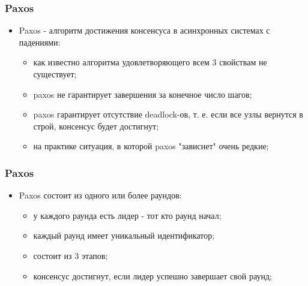 \begin{frame}
\frametitle{Paxos}
\begin{itemize}
  \item Paxos - алгоритм достижения консенсуса в асинхронных системах с падениями:
    \begin{itemize}
      \item как известно алгоритма удовлетворяющего всем 3 свойствам не существует;
      \item paxos не гарантирует завершения за конечное число шагов;
      \item paxos гарантирует отсутствие deadlock-ов, т. е. если все узлы вернутся в строй, консенсус будет достигнут;
      \item на практике ситуация, в которой paxos "зависнет" очень редкие;
    \end{itemize}
\end{itemize}
\end{frame}

\begin{frame}
\frametitle{Paxos}
\begin{itemize}
  \item Paxos состоит из одного или более раундов:
    \begin{itemize}
      \item у каждого раунда есть лидер - тот кто раунд начал;
      \item каждый раунд имеет уникальный идентификатор;
      \item состоит из 3 этапов;
      \item консенсус достигнут, если лидер успешно завершает свой раунд;
    \end{itemize}
\end{itemize}
\end{frame}

